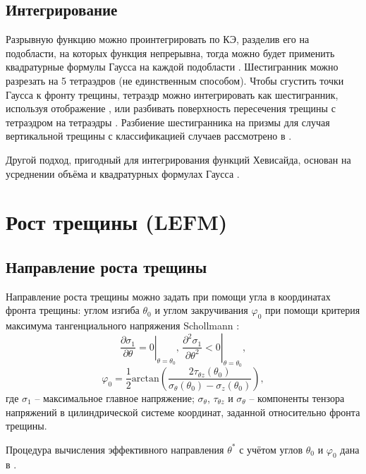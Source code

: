 \subsection{Интегрирование}
Разрывную функцию можно проинтегрировать по КЭ, разделив его на подобласти, на которых функция непрерывна, тогда можно будет применить квадратурные формулы Гаусса на каждой подобласти \cite{Fries2010,GuptaDiss2016,Weber2016}. Шестигранник можно разрезать на 5 тетраэдров (не единственным способом). Чтобы сгустить точки Гаусса к фронту трещины, тетраэдр можно интегрировать как шестигранник, используя отображение \cite{Minnebo2012}, или разбивать поверхность пересечения трещины с тетраэдром на тетраэдры \cite{GuptaDiss2016}. Разбиение шестигранника на призмы для случая вертикальной трещины с классификацией случаев рассмотрено в \cite{Nagashima2020}.

Другой подход, пригодный для интегрирования функций Хевисайда, основан на усреднении объёма и квадратурных формулах Гаусса \cite{Belytschko1988,Nikolakopoulos2020}.

\section{Рост трещины (LEFM)}
\subsection{Направление роста трещины}
Направление роста трещины можно задать при помощи угла в координатах фронта трещины: углом изгиба $\theta_0$ и углом закручивания $\varphi_0$ при помощи критерия максимума тангенциального напряжения Schollmann \cite{Schollmann2002}:
\begin{equation}
\left.\frac{\partial\sigma_1}{\partial\theta}=0\right|_{\theta=\theta_0},\,\left.\frac{\partial^2\sigma_1}{\partial\theta^2}<0\right|_{\theta=\theta_0},
\label{F:F_Schollmann1}
\end{equation}
\begin{equation}
\varphi_0=\frac{1}{2}\mathrm{arctan}\left( \frac{2\tau_{\theta z}\left(\theta_0 \right)}{\sigma_\theta\left(\theta_0 \right)-\sigma_z\left(\theta_0 \right)} \right),
\label{F:F_Schollmann2}
\end{equation}
где $\sigma_1$ -- максимальное главное напряжение; $\sigma_\theta$, $\tau_{\theta z}$ и $\sigma_\theta$ -- компоненты тензора напряжений в цилиндрической системе координат, заданной относительно фронта трещины.

Процедура вычисления эффективного направления $\theta^*$ с учётом углов $\theta_0$ и $\varphi_0$ дана в \cite{PereiraDiss2010}.
